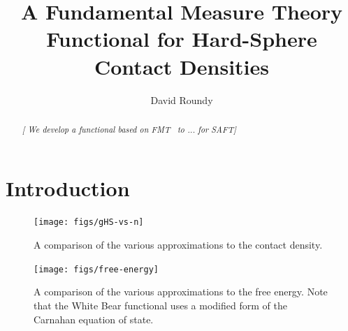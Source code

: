 \documentclass[letterpaper,twocolumn,amsmath,amssymb,prb]{revtex4-1}
\newcommand{\needsworklater}[1]{\emph{[#1]}}
\begin{document}
\title{A Fundamental Measure Theory Functional for Hard-Sphere Contact Densities}

\author{David Roundy}

\begin{abstract}
\needsworklater{ We develop a functional based on FMT~\cite{roth2002whitebear}
 to ... for SAFT}
\end{abstract}

\maketitle

\section{Introduction}


\begin{figure}
\texttt{[image: figs/gHS-vs-n]}
\caption{A comparison of the various approximations to the contact
  density.}
\label{fig:gHS-vs-n}
\end{figure}

\begin{figure}
\texttt{[image: figs/free-energy]}
\caption{A comparison of the various approximations to the free
  energy.  Note that the White Bear functional uses a modified form of
  the Carnahan equation of state.}
\label{fig:free-energy}
\end{figure}
\end{document}
